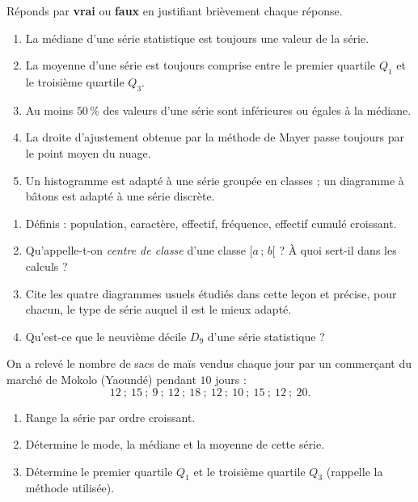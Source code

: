 \documentclass[11pt]{article}
\begin{document}
\begin{exercice}
Réponds par \textbf{vrai} ou \textbf{faux} en justifiant brièvement chaque réponse.
\begin{enumerate}
    \item La médiane d'une série statistique est toujours une valeur de la série.
    \item La moyenne d'une série est toujours comprise entre le premier quartile $Q_1$ et le troisième quartile $Q_3$.
    \item Au moins $50\,\%$ des valeurs d'une série sont inférieures ou égales à la médiane.
    \item La droite d'ajustement obtenue par la méthode de Mayer passe toujours par le point moyen du nuage.
    \item Un histogramme est adapté à une série groupée en classes ; un diagramme à bâtons est adapté à une série discrète.
\end{enumerate}
\end{exercice}

\begin{exercice}
\begin{enumerate}
    \item Définis : population, caractère, effectif, fréquence, effectif cumulé croissant.
    \item Qu'appelle-t-on \emph{centre de classe} d'une classe $[a\,;\,b[$ ? À quoi sert-il dans les calculs ?
    \item Cite les quatre diagrammes usuels étudiés dans cette leçon et précise, pour chacun, le type de série auquel il est le mieux adapté.
    \item Qu'est-ce que le neuvième décile $D_9$ d'une série statistique ?
\end{enumerate}
\end{exercice}

\begin{exercice}
On a relevé le nombre de sacs de maïs vendus chaque jour par un commerçant du marché de Mokolo (Yaoundé) pendant $10$ jours :
\[ 12\ ;\ 15\ ;\ 9\ ;\ 12\ ;\ 18\ ;\ 12\ ;\ 10\ ;\ 15\ ;\ 12\ ;\ 20. \]
\begin{enumerate}
    \item Range la série par ordre croissant.
    \item Détermine le mode, la médiane et la moyenne de cette série.
    \item Détermine le premier quartile $Q_1$ et le troisième quartile $Q_3$ (rappelle la méthode utilisée).
\end{enumerate}
\end{exercice}
\end{document}
